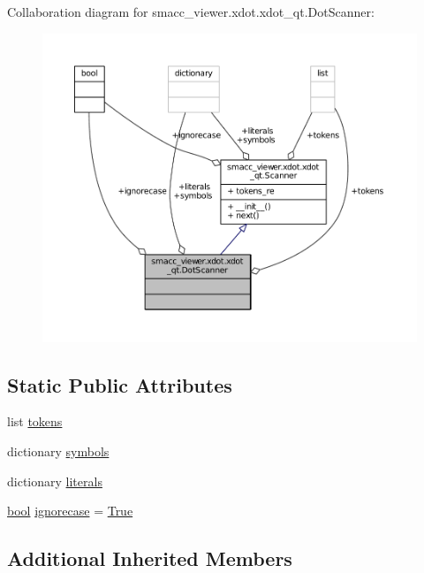 Collaboration diagram for smacc\+\_\+viewer.\+xdot.\+xdot\+\_\+qt.\+Dot\+Scanner\+:
\nopagebreak
\begin{figure}[H]
\begin{center}
\leavevmode
\includegraphics[width=350pt]{classsmacc__viewer_1_1xdot_1_1xdot__qt_1_1DotScanner__coll__graph}
\end{center}
\end{figure}
\subsection*{Static Public Attributes}
\begin{DoxyCompactItemize}
\item 
list \hyperlink{classsmacc__viewer_1_1xdot_1_1xdot__qt_1_1DotScanner_af10963a2b918de10ad86dd02714873ce}{tokens}
\item 
dictionary \hyperlink{classsmacc__viewer_1_1xdot_1_1xdot__qt_1_1DotScanner_ab465e4646fec3fb737e596e422e067b8}{symbols}
\item 
dictionary \hyperlink{classsmacc__viewer_1_1xdot_1_1xdot__qt_1_1DotScanner_aa0c6015194ae00e9eb25d54f288c617b}{literals}
\item 
\hyperlink{classbool}{bool} \hyperlink{classsmacc__viewer_1_1xdot_1_1xdot__qt_1_1DotScanner_a40067d1427198e7d89dff89bab3d7605}{ignorecase} = \hyperlink{namespacesmacc__viewer_a48e3092f51d8fc570fcb3d6c76e27f3b}{True}
\end{DoxyCompactItemize}
\subsection*{Additional Inherited Members}


